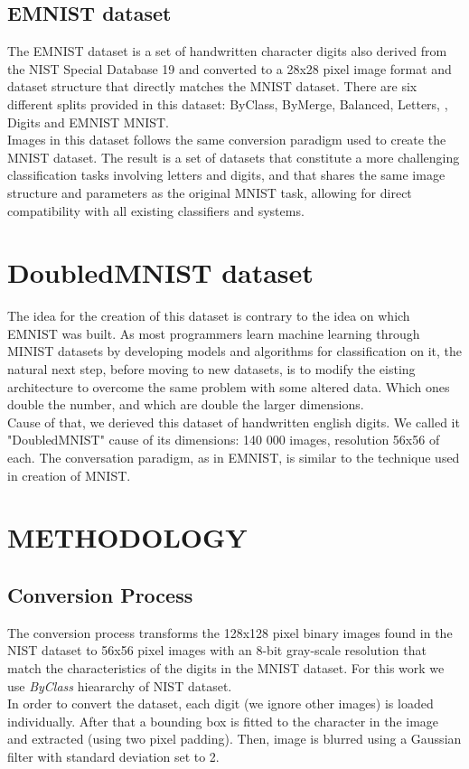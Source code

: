 \documentclass[letterpaper, 10 pt, conference]{ieeeconf}
\begin{document}
\subsection{EMNIST dataset}
The EMNIST dataset is a set of handwritten character digits also derived from the NIST Special Database 19  and converted to a 28x28 pixel image format and dataset structure that directly matches the MNIST dataset. There are six different splits provided in this dataset: ByClass, ByMerge, Balanced, Letters, , Digits and EMNIST MNIST. \\
Images in this dataset follows the same conversion paradigm used to create the MNIST dataset. The result is a set of datasets that constitute a more challenging classification tasks involving letters and digits, and that shares the same image structure and parameters as the original MNIST
task, allowing for direct compatibility with all existing classifiers and systems.

\section{DoubledMNIST dataset}

The idea for the creation of this dataset is contrary to the idea on which EMNIST was built. As most programmers learn machine learning through MINIST datasets by developing models and algorithms for classification on it, the natural next step, before moving to new datasets, is to modify the eisting architecture to overcome the same problem with some altered data. Which ones double the number, and which are double the larger dimensions. \\
Cause of that, we derieved this dataset of handwritten english digits. We called it "DoubledMNIST" cause of its dimensions: 140 000 images, resolution 56x56 of each. The conversation paradigm, as in EMNIST, is similar to the technique used in creation of MNIST. 

\section{METHODOLOGY}
\subsection{Conversion Process}
The conversion process transforms the 128x128 pixel
binary images found in the NIST dataset to 56x56 pixel
images with an 8-bit gray-scale resolution that match the characteristics of the digits in the MNIST dataset. For this work we use \textit{ByClass} hieararchy of NIST dataset. \\
In order to convert the dataset, each digit (we ignore other images) is loaded individually. After that a bounding box is fitted to the character in the image and extracted (using two pixel padding). Then, image is blurred using a Gaussian filter with standard deviation set to 2. 
\end{document}
